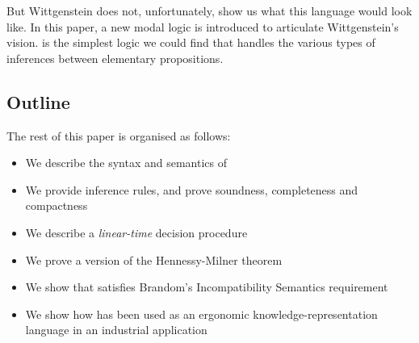\NI But Wittgenstein does not, unfortunately, show us what this
language would look like.  In this paper, a new modal logic is
introduced to articulate Wittgenstein's vision.  \ELFULL{} is the simplest logic we could find that handles the various types of inferences between elementary propositions.

\subsection{Outline}
The rest of this paper is organised as follows:
\begin{itemize}
\item
We describe the syntax and semantics of \ELFULL{}
\item
We provide inference rules, and prove soundness, completeness and compactness
\item
We describe a \emph{linear-time} decision procedure
\item
We prove a version of the Hennessy-Milner theorem
\item
We show that \ELFULL{} satisfies Brandom's Incompatibility Semantics requirement
\item
We show how \ELFULL{} has been used as an ergonomic knowledge-representation language in an industrial application
\end{itemize}

